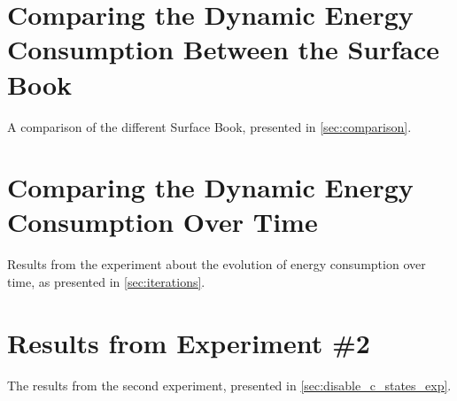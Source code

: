 \section{Comparing the Dynamic Energy Consumption Between the Surface Book}\label{app:comparison_surfacebook}
A comparison of the different Surface Book, presented in \cref{sec:comparison}.



% 
% 

\newpage

\section{Comparing the Dynamic Energy Consumption Over Time}\label{app:iterations}
Results from the experiment about the evolution of energy consumption over time, as presented in \cref{sec:iterations}.



% 
% 
\newpage


\section{Results from Experiment \#2}\label{app:exp_two}
The results from the second experiment, presented in \cref{sec:disable_c_states_exp}.


% 

\newpage

